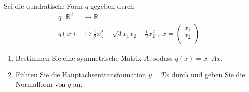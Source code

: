 \newpage

\subsubsection{} %

Sei die quadratische Form \( q \) gegeben durch \[ \begin{aligned} q: \; \mathbb{R}^2 &\rightarrow \mathbb{R} \\ q(x) &\mapsto \frac{1}{2}x_1^2 + \sqrt{3}x_1x_2-\frac{1}{2}x_2^2 \;, \;x= \begin{pmatrix} x_1 \\ x_2\\ \end{pmatrix} \end{aligned} \]

\begin{enumerate}[label=\alph*)]
    \item Bestimmen Sie eine symmetrische Matrix \( A \), sodass \( q(x)=x^\top Ax \).
    \item Führen Sie die Hauptachsentransformation \( y=Tx \) durch und geben Sie die Normalform von \( q \) an.
\end{enumerate}

\vspace{1\baselineskip}


